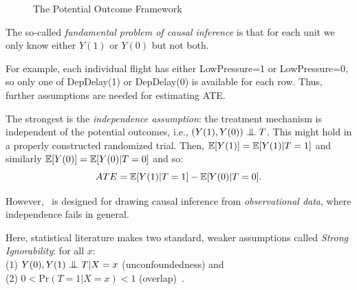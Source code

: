 \begin{figure}
  \centering
{
}
\caption{The Potential Outcome Framework}
  \label{fig:causal:inference}
  \vspace{-3mm}
\end{figure}
\noindent
The so-called {\em fundamental problem of causal inference} %
is that
for each unit we only know either $Y(1)$ or $Y(0)$ but not both.
 For example, each individual
flight has either LowPressure=1 or LowPressure=0, so only one of DepDelay(1)
or DepDelay(0) is available for each row.
Thus, further assumptions are needed for estimating ATE. 


The strongest is the {\em independence assumption}:
the treatment mechanism is independent of the potential outcomes,
i.e., $(Y(1), Y(0)) \bigCI T$. This might hold in a properly constructed randomized trial. Then,
$\mathbb{E}[Y(1)]=\mathbb{E}[Y(1)|T=1]$ and similarly $\mathbb{E}[Y(0)]=\mathbb{E}[Y(0)|T=0]$ and so:  $$ATE = \mathbb{E}[Y(1)|T=1]-\mathbb{E}[Y(0)|T=0].$$

However, \GSQL\  is designed for drawing causal inference from {\em
  observational data}, where independence fails in general.   Here, statistical literature makes two standard, weaker
assumptions called {\em Strong
  Ignorability}: for all $x$: \\%
  (1)  ${Y(0), Y(1) \bigCI T} | X=x$ (unconfoundedness) and \\
  (2) $0 < \textrm{Pr}(T = 1 | X=x) < 1$ (overlap)~\cite{Rubin1983b}.


